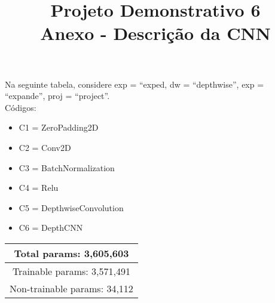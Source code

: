 \documentclass{bmvc2k}
\title{Projeto Demonstrativo 6\\ Anexo - Descrição da CNN}
\begin{document}
\maketitle

Na seguinte tabela, considere exp = ``exped, dw = ``depthwise'', exp = ``expande'', proj = ``project''. \\

Códigos:

\begin{itemize}
\item C1 = ZeroPadding2D
\item C2 = Conv2D
\item C3 = BatchNormalization
\item C4 = Relu
\item C5 = DepthwiseConvolution
\item C6 = DepthCNN
\end{itemize}

\begin{table}[ht]
\centering
\begin{tabular}{|c|}
\hline
Total params: 3,605,603         \\ \hline
Trainable params: 3,571,491     \\ \hline
Non-trainable params: 34,112    \\ \hline
\end{tabular}
\end{table}
\end{document}
